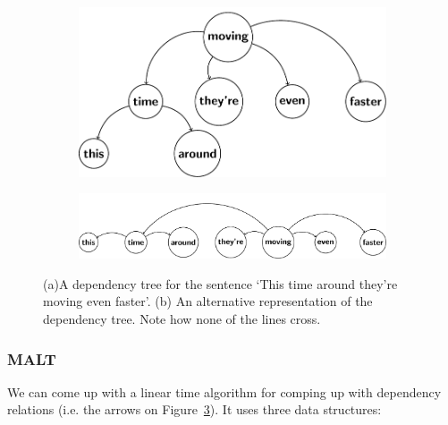 \begin{figure}[h]
  \centering
    \begin{subfigure}[b]{0.55\textwidth}
    \includegraphics[width=\textwidth]{diagrams/dependency-tree}
    \caption{}
    \label{fig:dependency-tree}
  \end{subfigure}

  \begin{subfigure}[b]{0.55\textwidth}
    \includegraphics[width=\textwidth]{diagrams/dependency-relations}
    \caption{}
    \label{fig:dependency-relations}
  \end{subfigure}

  \caption[Two dependency representations]{(a)A dependency tree for the sentence 
  `This time around they're moving even faster'. (b) An alternative 
  representation of the dependency tree. Note how none of the lines cross.}
\end{figure}

\subsubsection{MALT}

\let\thefootnote\relax{}

We can come up with a linear time algorithm for comping up with dependency
relations (i.e. the arrows on Figure~\ref{fig:dependency-relations}). It uses
three data structures:

